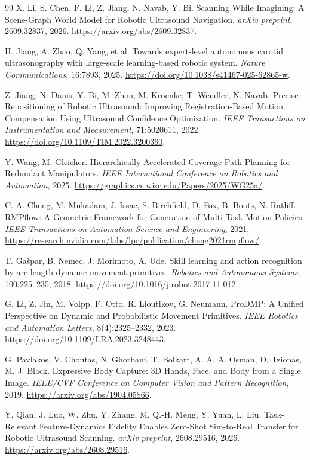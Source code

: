 \documentclass[UTF8,11pt,a4paper,fontset=fandol]{ctexart}
\numberwithin{equation}{section}
\theoremstyle{definition}
\begin{document}
\begin{thebibliography}{99}
X. Li, S. Chen, F. Li, Z. Jiang, N. Navab, Y. Bi.
Scanning While Imagining: A Scene-Graph World Model for Robotic Ultrasound Navigation.
\emph{arXiv preprint}, 2609.32837, 2026.
\url{https://arxiv.org/abs/2609.32837}.

H. Jiang, A. Zhao, Q. Yang, et al.
Towards expert-level autonomous carotid ultrasonography with large-scale learning-based robotic system.
\emph{Nature Communications}, 16:7893, 2025.
\url{https://doi.org/10.1038/s41467-025-62865-w}.

Z. Jiang, N. Danis, Y. Bi, M. Zhou, M. Kroenke, T. Wendler, N. Navab.
Precise Repositioning of Robotic Ultrasound: Improving Registration-Based Motion Compensation Using Ultrasound Confidence Optimization.
\emph{IEEE Transactions on Instrumentation and Measurement}, 71:5020611, 2022.
\url{https://doi.org/10.1109/TIM.2022.3200360}.

Y. Wang, M. Gleicher.
Hierarchically Accelerated Coverage Path Planning for Redundant Manipulators.
\emph{IEEE International Conference on Robotics and Automation}, 2025.
\url{https://graphics.cs.wisc.edu/Papers/2025/WG25a/}.

C.-A. Cheng, M. Mukadam, J. Issac, S. Birchfield, D. Fox, B. Boots, N. Ratliff.
RMPflow: A Geometric Framework for Generation of Multi-Task Motion Policies.
\emph{IEEE Transactions on Automation Science and Engineering}, 2021.
\url{https://research.nvidia.com/labs/lpr/publication/cheng2021rmpflow/}.

T. Ga\v{s}par, B. Nemec, J. Morimoto, A. Ude.
Skill learning and action recognition by arc-length dynamic movement primitives.
\emph{Robotics and Autonomous Systems}, 100:225--235, 2018.
\url{https://doi.org/10.1016/j.robot.2017.11.012}.

G. Li, Z. Jin, M. Volpp, F. Otto, R. Lioutikov, G. Neumann.
ProDMP: A Unified Perspective on Dynamic and Probabilistic Movement Primitives.
\emph{IEEE Robotics and Automation Letters}, 8(4):2325--2332, 2023.
\url{https://doi.org/10.1109/LRA.2023.3248443}.

G. Pavlakos, V. Choutas, N. Ghorbani, T. Bolkart, A. A. A. Osman, D. Tzionas, M. J. Black.
Expressive Body Capture: 3D Hands, Face, and Body from a Single Image.
\emph{IEEE/CVF Conference on Computer Vision and Pattern Recognition}, 2019.
\url{https://arxiv.org/abs/1904.05866}.

Y. Qian, J. Luo, W. Zhu, Y. Zhang, M. Q.-H. Meng, Y. Yuan, L. Liu.
Task-Relevant Feature-Dynamics Fidelity Enables Zero-Shot Sim-to-Real Transfer for Robotic Ultrasound Scanning.
\emph{arXiv preprint}, 2608.29516, 2026.
\url{https://arxiv.org/abs/2608.29516}.


\end{thebibliography}
\end{document}
